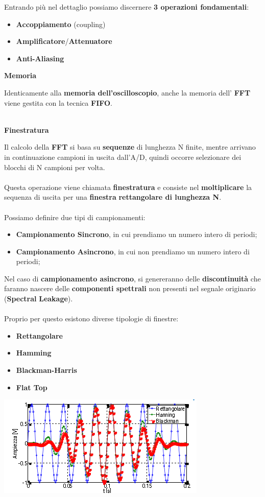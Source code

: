Entrando più nel dettaglio possiamo discernere \textbf{3 operazioni fondamentali}:
\begin{itemize}
    \item \textbf{Accoppiamento} (coupling)
    \item \textbf{Amplificatore}/\textbf{Attenuatore}
    \item \textbf{Anti-Aliasing}
\end{itemize}
\begin{center}
    \textbf{Memoria}
\end{center}
Identicamente alla \textbf{memoria dell'oscilloscopio}, anche la memoria dell' \textbf{FFT} viene gestita con la tecnica \textbf{FIFO}.\\ \\
\begin{center}
    \textbf{Finestratura}
\end{center}
Il calcolo della \textbf{FFT} si basa su \textbf{sequenze} di lunghezza N finite, mentre arrivano in continuazione campioni in uscita dall'A/D, quindi occorre selezionare dei blocchi di N campioni per volta.\\ \\
Questa operazione viene chiamata \textbf{finestratura} e consiste nel \textbf{moltiplicare} la sequenza di uscita per una \textbf{finestra} \textbf{rettangolare di lunghezza N}.\\ \\
Possiamo definire due tipi di campionamenti:
\begin{itemize}
    \item \textbf{Campionamento Sincrono}, in cui prendiamo un numero intero di periodi;
    \item \textbf{Campionamento Asincrono}, in cui non prendiamo un numero intero di periodi;
\end{itemize}
Nel caso di \textbf{campionamento asincrono}, si genereranno delle \textbf{discontinuità} che faranno nascere delle \textbf{componenti spettrali} non presenti nel segnale originario (\textbf{Spectral} \textbf{Leakage}).\\ \\
Proprio per questo esistono diverse tipologie di finestre:
\begin{itemize}
    \item \textbf{Rettangolare}
    \item \textbf{Hamming}
    \item \textbf{Blackman-Harris}
    \item \textbf{Flat Top}
\end{itemize}
\begin{center}
    \includegraphics[width=.8\textwidth]{Images/figure47.png}
\end{center}